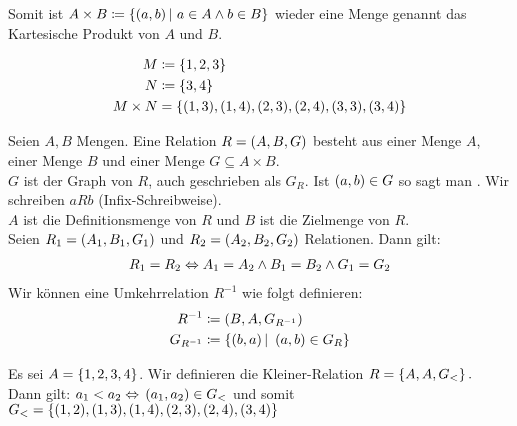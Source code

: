 \begin{definition}
    Somit ist $A \times B \coloneqq \left\{\left(a,b\right)|~a\in A \land b \in B\right\}$ wieder eine Menge genannt das Kartesische Produkt von $A$ und $B$.
\end{definition}

\begin{beispiel}
    \begin{align*}
        M &\coloneqq \left\{1,2,3\right\}\\
        N &\coloneqq \left\{3,4\right\}\\
        M\times N &= \left\{(1,3), (1,4), (2,3), (2,4), (3,3), (3,4)\right\}
    \end{align*}
\end{beispiel}


\begin{definition}[Relation]
    Seien $A, B$ Mengen. Eine Relation $R=\left(A, B, G\right)$ besteht aus einer Menge $A$, einer Menge $B$ und einer Menge $G\subseteq A\times B$.\\
    $G$ ist der Graph von $R$, auch geschrieben als $G_R$.
    Ist $\left(a,b\right)\in G$ so sagt man . Wir schreiben $aRb$ (Infix-Schreibweise).\\
    $A$ ist die Definitionsmenge von $R$ und $B$ ist die Zielmenge von $R$.\\[10pt]
    Seien $R_1 = \left(A_1, B_1, G_1\right)$ und $R_2 = \left(A_2, B_2, G_2\right)$ Relationen. Dann gilt:
    \begin{align*}
        R_1 = R_2 \Leftrightarrow{} A_1 = A_2 \land B_1 = B_2 \land G_1 = G_2
    \end{align*}
    Wir können eine Umkehrrelation $R^{-1}$ wie folgt definieren:
    \begin{align*}
        R^{-1} &\coloneqq \left(B,A,G_{R^{-1}}\right)\\
        G_{R^{-1}} &\coloneqq \left\{\left(b,a\right) |~\left(a,b\right) \in G_R\right\}
    \end{align*}
\end{definition}

\begin{beispiel}
    Es sei $A = \left\{1,2,3,4\right\}$. Wir definieren die Kleiner-Relation $R=\left\{A, A, G_{<}\right\}.$\\
    Dann gilt: $a_1 < a_2 \Leftrightarrow{} \left(a_1, a_2\right) \in G_{<}$ und somit $G_{<} = \left\{(1,2), (1,3), (1,4), (2,3), (2,4), (3,4)\right\}$
\end{beispiel}


